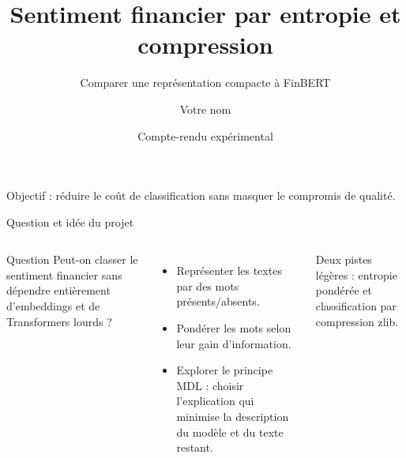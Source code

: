 \documentclass[aspectratio=169,10pt]{beamer}
\title[Sentiment efficace]{Sentiment financier par entropie et compression}
\subtitle{Comparer une représentation compacte à FinBERT}
\author{Votre nom}
\institute{Votre établissement}
\date{Compte-rendu expérimental}
\begin{document}
\begin{frame}[plain]
  \titlepage
  \vspace{-0.5cm}
  \begin{center}
    \small\color{navy!75}
    Objectif : réduire le coût de classification sans masquer le compromis de qualité.
  \end{center}
\end{frame}

\begin{frame}{Question et idée du projet}
  \begin{columns}[T,onlytextwidth]
      \begin{block}{Question}
        Peut-on classer le sentiment financier sans dépendre entièrement
        d'embeddings et de Transformers lourds ?
      \end{block}
      \begin{itemize}
        \item Représenter les textes par des mots présents/absents.
        \item Pondérer les mots selon leur gain d'information.
        \item Explorer le principe MDL : choisir l'explication qui minimise
        la description du modèle et du texte restant.
      \end{itemize}
      \vspace{0.35cm}
      {\scriptsize\color{muted}Deux pistes légères : entropie pondérée et
      classification par compression zlib.}
  \end{columns}
\end{frame}
\end{document}
